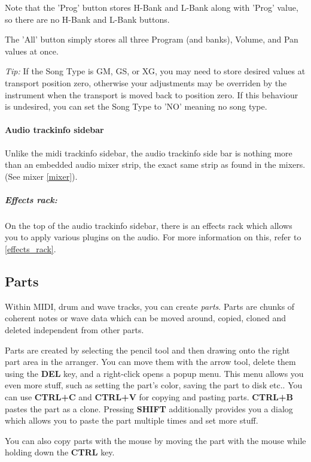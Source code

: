 \documentclass[a4paper]{report}
\newcommand{\key}[1]{\textbf{#1}}
\begin{document}
Note that the 'Prog' button stores H-Bank and L-Bank along with
'Prog' value, so there are no H-Bank and L-Bank buttons.

The 'All' button simply stores all three Program (and banks), Volume,
and Pan values at once.

\emph{Tip:} If the Song Type is GM, GS, or XG, you may need to store           %
desired values at transport position zero, otherwise your adjustments
may be overriden by the instrument when the transport is moved back
to position zero. If this behaviour is undesired, you can set the 
Song Type to 'NO' meaning no song type.                                        %

\paragraph{Audio trackinfo sidebar}
Unlike the midi trackinfo sidebar, the audio trackinfo side bar
is nothing more than an embedded audio mixer strip, the exact same 
strip as found in the mixers. (See mixer \ref{mixer}).
\subparagraph{Effects rack:}
On the top of the audio trackinfo sidebar, there is an effects rack
which allows you to apply various plugins on the audio. For more
information on this, refer to \ref{effects_rack}.


\subsection{Parts}
Within MIDI, drum and wave tracks, you can create \emph{parts}. Parts
are chunks of coherent notes or wave data which can be moved around,
copied, cloned and deleted independent from other parts.

Parts are created by selecting the pencil tool and then drawing onto
the right part area in the arranger. You can move them with the arrow
tool, delete them using the \key{DEL} key, and a right-click opens
a popup menu. This menu allows you even more stuff, such as setting
the part's color, saving the part to disk etc.. You can use
\key{CTRL+C} and \key{CTRL+V} for copying and pasting parts.
\key{CTRL+B} pastes the part as a clone. Pressing \key{SHIFT}
additionally provides you a dialog which allows you to paste the part
multiple times and set more stuff.

You can also copy parts with the mouse by moving the part with the mouse
while holding down the \key{CTRL} key.
\end{document}
